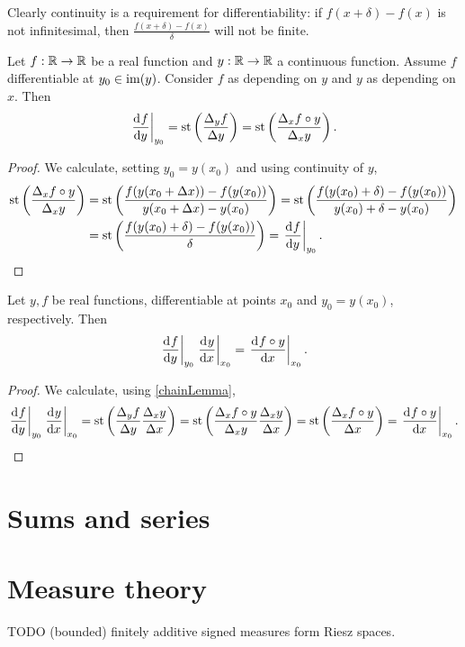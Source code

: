 Clearly continuity is a requirement for differentiability: if $f(x+\delta) - f(x)$ is not infinitesimal, then $\frac{f(x+\delta) - f(x)}{\delta}$ will not be finite.

\begin{lemma} \label{chainLemma}
Let $f:\mathbb{R}\to\mathbb{R}$ be a real function and $y:\mathbb{R}\to\mathbb{R}$ a continuous function. Assume $f$ differentiable at $y_0\in\operatorname{im}(y)$. Consider $f$ as depending on $y$ and $y$ as depending on $x$. Then
\[ \left.\mathinner{ \dfrac{\operatorname{d \!}{^{}}f}{\operatorname{d \!}{{y}^{}}} }\right|_{y_0} = \operatorname{st}\left(\frac{\Delta_y f}{\Delta y}\right) = \operatorname{st}\left(\frac{\Delta_x f\circ y}{\Delta_x y}\right). \]
\end{lemma}
\begin{proof}
We calculate, setting $y_0 = y(x_0)$ and using continuity of $y$,
\begin{align*}
\operatorname{st}\left(\frac{\Delta_x f\circ y}{\Delta_x y}\right) &= \operatorname{st}\left(\frac{f(y(x_0+\Delta x)) -f(y(x_0))}{y(x_0+\Delta x) - y(x_0)}\right) = \operatorname{st}\left(\frac{f(y(x_0)+\delta) -f(y(x_0))}{y(x_0)+\delta - y(x_0)}\right) \\
&= \operatorname{st}\left(\frac{f(y(x_0)+\delta) -f(y(x_0))}{\delta}\right) = \left.\mathinner{ \dfrac{\operatorname{d \!}{^{}}f}{\operatorname{d \!}{{y}^{}}} }\right|_{y_0}.
\end{align*}
\end{proof}

\begin{proposition}
Let $y,f$ be real functions, differentiable at points $x_0$ and $y_0=y(x_0)$, respectively. Then
\[ \left.\mathinner{ \dfrac{\operatorname{d \!}{^{}}f}{\operatorname{d \!}{{y}^{}}} }\right|_{y_0} \left.\mathinner{ \dfrac{\operatorname{d \!}{^{}}y}{\operatorname{d \!}{{x}^{}}} }\right|_{x_0} = \left.\mathinner{ \dfrac{\operatorname{d \!}{^{}}f\circ y}{\operatorname{d \!}{{x}^{}}} }\right|_{x_0}. \]
\end{proposition}
\begin{proof}
We calculate, using \ref{chainLemma},
\[ \left.\mathinner{ \dfrac{\operatorname{d \!}{^{}}f}{\operatorname{d \!}{{y}^{}}} }\right|_{y_0} \left.\mathinner{ \dfrac{\operatorname{d \!}{^{}}y}{\operatorname{d \!}{{x}^{}}} }\right|_{x_0} = \operatorname{st}\left(\frac{\Delta_y f}{\Delta y}\frac{\Delta_x y}{\Delta x}\right) = \operatorname{st}\left(\frac{\Delta_x f\circ y}{\Delta_x y}\frac{\Delta_x y}{\Delta x}\right) = \operatorname{st}\left(\frac{\Delta_x f\circ y}{\Delta x}\right) = \left.\mathinner{ \dfrac{\operatorname{d \!}{^{}}f\circ y}{\operatorname{d \!}{{x}^{}}} }\right|_{x_0}. \]
\end{proof}

\chapter{Sums and series}


\chapter{Measure theory}
TODO (bounded) finitely additive signed measures form Riesz spaces.

